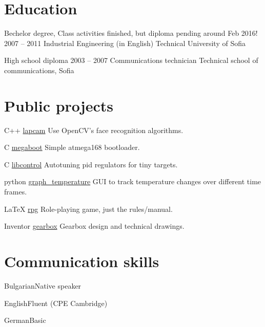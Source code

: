 \documentclass{tccv}
\begin{document}
\section{Education}
\begin{yearlist}
\item[Bechelor degree, \small \textsf{Class activities finished, but diploma pending around Feb 2016!}]{2007 -- 2011}
     {Industrial Engineering (in English)}
     {Technical University of Sofia}

\item[High school diploma]{2003 -- 2007}
     {Communications technician}
     {Technical school of communications, Sofia}
\end{yearlist}


\section{Public projects}
\begin{yearlist}
\item{C++}
     {\href{https://github.com/MiroslavVitkov/lapcam}{lapcam}}
     {Use OpenCV's face recognition algorithms.}

\item{C}
     {\href{https://github.com/MiroslavVitkov/megaboot}{megaboot}}
     {Simple atmega168 bootloader.}

\item{C}
     {\href{https://github.com/MiroslavVitkov/libcontrol}{libcontrol}}
     {Autotuning pid regulators for tiny targets.}

\item{python}
     {\href{https://github.com/MiroslavVitkov/graph_temperature}{graph\_temperature}}
     {GUI to track temperature changes over different time frames.}

\item{LaTeX}
     {\href{https://github.com/MiroslavVitkov/rpg}{rpg}}
     {Role-playing game, just the rules/manual. }

\item{Inventor}
     {\href{https://github.com/MiroslavVitkov/gearbox}{gearbox}}
     {Gearbox design and technical drawings.}
\end{yearlist}


\section{Communication skills}
\begin{factlist}
\item{Bulgarian}{Native speaker}
\item{English}{Fluent (CPE Cambridge)}
\item{German}{Basic}
\end{factlist}
\end{document}
